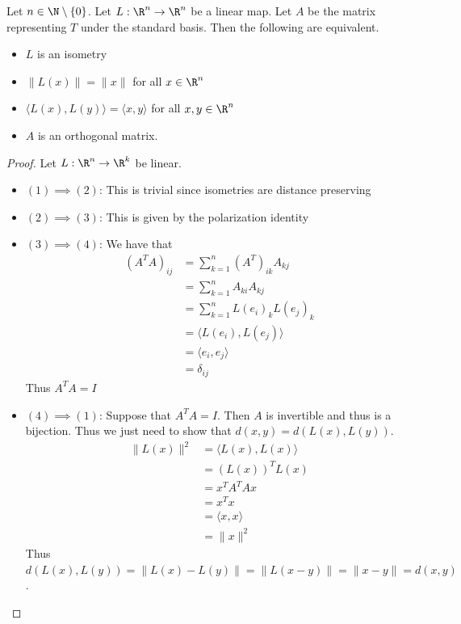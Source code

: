 \documentclass[a4paper]{article}
\begin{document}
\begin{prp}{}{} Let $n\in\N\setminus\{0\}$. Let $L:\R^n\to\R^n$ be a linear map. Let $A$ be the matrix representing $T$ under the standard basis. Then the following are equivalent. 
\begin{itemize}
\item $L$ is an isometry
\item $\|L(x)\|=\|x\|$ for all $x\in\R^n$
\item $\langle L(x),L(y)\rangle=\langle x,y\rangle$ for all $x,y\in\R^n$
\item $A$ is an orthogonal matrix. 
\end{itemize}
\begin{proof} Let $L:\R^n\to\R^k$ be linear. 
\begin{itemize}
\item $(1)\implies(2)$: This is trivial since isometries are distance preserving
\item $(2)\implies(3)$: This is given by the polarization identity
\item $(3)\implies(4)$: We have that  
\begin{align*}
\left(A^TA\right)_{ij}&=\sum_{k=1}^n(A^T)_{ik}A_{kj}\\
&=\sum_{k=1}^nA_{ki}A_{kj}\\
&=\sum_{k=1}^nL(e_i)_kL(e_j)_k\\
&=\langle L(e_i),L(e_j)\rangle\\
&=\langle e_i,e_j\rangle\tag{By $(3)$}\\
&=\delta_{ij}
\end{align*} Thus $A^TA=I$
\item $(4)\implies(1)$: Suppose that $A^TA=I$. Then $A$ is invertible and thus is a bijection. Thus we just need to show that $d(x,y)=d(L(x),L(y))$.
\begin{align*}
\|L(x)\|^2&=\langle L(x),L(x)\rangle\\
&=(L(x))^TL(x)\\
&=x^TA^TAx\\
&=x^Tx\\
&=\langle x,x\rangle\\
&=\|x\|^2
\end{align*}
Thus $d(L(x),L(y))=\|L(x)-L(y)\|=\|L(x-y)\|=\|x-y\|=d(x,y)$. 
\end{itemize}
\end{proof}
\end{prp}
\end{document}
